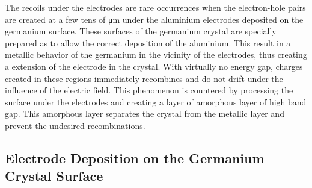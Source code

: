 

The recoils under the electrodes are rare occurrences when the electron-hole pairs are created at a few tens of \si{\micro\m} under the aluminium electrodes deposited on the germanium surface. These surfaces of the germanium crystal are specially prepared as to allow the correct deposition of the aluminium. This result in a metallic behavior of the germanium in the vicinity of the electrodes, thus creating a extension of the electrode in the crystal. With virtually no energy gap, charges created in these regions immediately recombines and do not drift under the influence of the electric field. This phenomenon is countered by processing the surface under the electrodes and creating a layer of amorphous layer of high band gap. This amorphous layer separates the crystal from the metallic layer and prevent the undesired recombinations.


\subsection{Electrode Deposition on the Germanium Crystal Surface}


